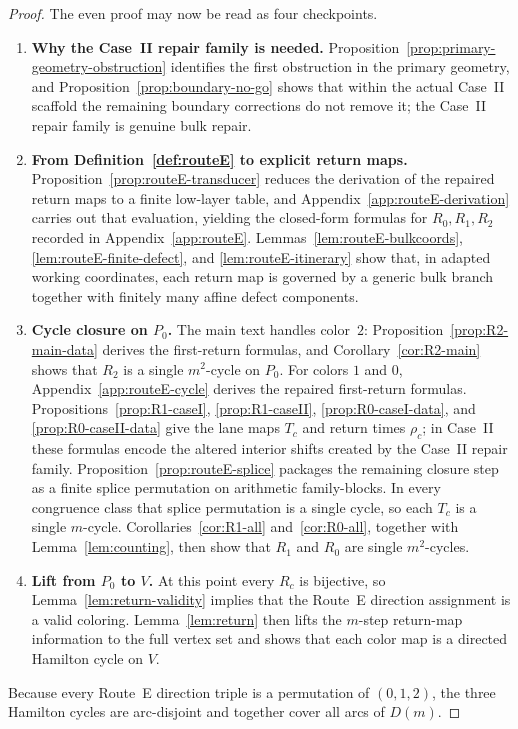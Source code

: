 \documentclass[11pt]{article}
\begin{document}
\begin{proof}
The even proof may now be read as four checkpoints.
\begin{enumerate}[label=\textup{(\roman*)},leftmargin=2.5em]
\item \textbf{Why the Case~II repair family is needed.}
Proposition~\ref{prop:primary-geometry-obstruction} identifies the first obstruction in the primary geometry, and Proposition~\ref{prop:boundary-no-go} shows that within the actual Case~II scaffold the remaining boundary corrections do not remove it; the Case~II repair family is genuine bulk repair.

\item \textbf{From Definition~\ref{def:routeE} to explicit return maps.}
Proposition~\ref{prop:routeE-transducer} reduces the derivation of the repaired return maps to a finite low-layer table, and Appendix~\ref{app:routeE-derivation} carries out that evaluation, yielding the closed-form formulas for $R_0,R_1,R_2$ recorded in Appendix~\ref{app:routeE}.
Lemmas~\ref{lem:routeE-bulkcoords}, \ref{lem:routeE-finite-defect}, and \ref{lem:routeE-itinerary} show that, in adapted working coordinates, each return map is governed by a generic bulk branch together with finitely many affine defect components.

\item \textbf{Cycle closure on $P_0$.}
The main text handles color~$2$: Proposition~\ref{prop:R2-main-data} derives the first-return formulas, and Corollary~\ref{cor:R2-main} shows that $R_2$ is a single $m^2$-cycle on $P_0$.
For colors $1$ and $0$, Appendix~\ref{app:routeE-cycle} derives the repaired first-return formulas.
Propositions~\ref{prop:R1-caseI}, \ref{prop:R1-caseII}, \ref{prop:R0-caseI-data}, and \ref{prop:R0-caseII-data} give the lane maps $T_c$ and return times $\rho_c$; in Case~II these formulas encode the altered interior shifts created by the Case~II repair family.
Proposition~\ref{prop:routeE-splice} packages the remaining closure step as a finite splice permutation on arithmetic family-blocks.
In every congruence class that splice permutation is a single cycle, so each $T_c$ is a single $m$-cycle.
Corollaries~\ref{cor:R1-all} and~\ref{cor:R0-all}, together with Lemma~\ref{lem:counting}, then show that $R_1$ and $R_0$ are single $m^2$-cycles.

\item \textbf{Lift from $P_0$ to $V$.}
At this point every $R_c$ is bijective, so Lemma~\ref{lem:return-validity} implies that the Route~E direction assignment is a valid coloring.
Lemma~\ref{lem:return} then lifts the $m$-step return-map information to the full vertex set and shows that each color map is a directed Hamilton cycle on $V$.
\end{enumerate}
Because every Route~E direction triple is a permutation of $(0,1,2)$, the three Hamilton cycles are arc-disjoint and together cover all arcs of $D(m)$.
\end{proof}
\end{document}
